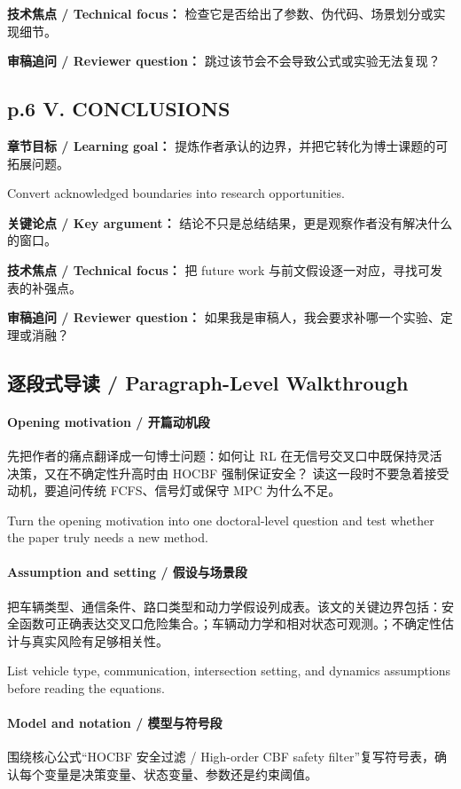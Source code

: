 \documentclass[UTF8,a4paper,11pt,fontset=fandol]{ctexart}
\begin{document}
\textbf{技术焦点 / Technical focus：} 检查它是否给出了参数、伪代码、场景划分或实现细节。

\textbf{审稿追问 / Reviewer question：} 跳过该节会不会导致公式或实验无法复现？

\subsection*{p.6 V. CONCLUSIONS}
\textbf{章节目标 / Learning goal：} 提炼作者承认的边界，并把它转化为博士课题的可拓展问题。

Convert acknowledged boundaries into research opportunities.

\textbf{关键论点 / Key argument：} 结论不只是总结结果，更是观察作者没有解决什么的窗口。

\textbf{技术焦点 / Technical focus：} 把 future work 与前文假设逐一对应，寻找可发表的补强点。

\textbf{审稿追问 / Reviewer question：} 如果我是审稿人，我会要求补哪一个实验、定理或消融？


\subsection{逐段式导读 / Paragraph-Level Walkthrough}
\paragraph{Opening motivation / 开篇动机段}先把作者的痛点翻译成一句博士问题：如何让 RL 在无信号交叉口中既保持灵活决策，又在不确定性升高时由 HOCBF 强制保证安全？ 读这一段时不要急着接受动机，要追问传统 FCFS、信号灯或保守 MPC 为什么不足。

Turn the opening motivation into one doctoral-level question and test whether the paper truly needs a new method.

\paragraph{Assumption and setting / 假设与场景段}把车辆类型、通信条件、路口类型和动力学假设列成表。该文的关键边界包括：安全函数可正确表达交叉口危险集合。；车辆动力学和相对状态可观测。；不确定性估计与真实风险有足够相关性。

List vehicle type, communication, intersection setting, and dynamics assumptions before reading the equations.

\paragraph{Model and notation / 模型与符号段}围绕核心公式“HOCBF 安全过滤 / High-order CBF safety filter”复写符号表，确认每个变量是决策变量、状态变量、参数还是约束阈值。
\end{document}
